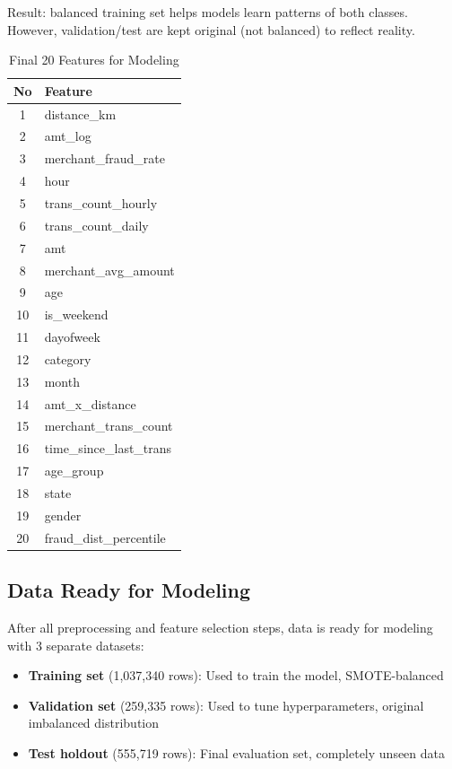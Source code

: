 Result: balanced training set helps models learn patterns of both classes. However, validation/test are kept original (not balanced) to reflect reality.

\begin{table}[H]
\centering
\caption{Final 20 Features for Modeling}
\small
\begin{tabular}{|c|l|}
\hline
\textbf{No} & \textbf{Feature} \\
\hline
1 & distance\_km \\
\hline
2 & amt\_log \\
\hline
3 & merchant\_fraud\_rate \\
\hline
4 & hour \\
\hline
5 & trans\_count\_hourly \\
\hline
6 & trans\_count\_daily \\
\hline
7 & amt \\
\hline
8 & merchant\_avg\_amount \\
\hline
9 & age \\
\hline
10 & is\_weekend \\
\hline
11 & dayofweek \\
\hline
12 & category \\
\hline
13 & month \\
\hline
14 & amt\_x\_distance \\
\hline
15 & merchant\_trans\_count \\
\hline
16 & time\_since\_last\_trans \\
\hline
17 & age\_group \\
\hline
18 & state \\
\hline
19 & gender \\
\hline
20 & fraud\_dist\_percentile \\
\hline
\end{tabular}
\end{table}

\subsection{Data Ready for Modeling}

After all preprocessing and feature selection steps, data is ready for modeling with 3 separate datasets:

\begin{itemize}
    \item \textbf{Training set} (1,037,340 rows): Used to train the model, SMOTE-balanced
    \item \textbf{Validation set} (259,335 rows): Used to tune hyperparameters, original imbalanced distribution
    \item \textbf{Test holdout} (555,719 rows): Final evaluation set, completely unseen data
\end{itemize}

